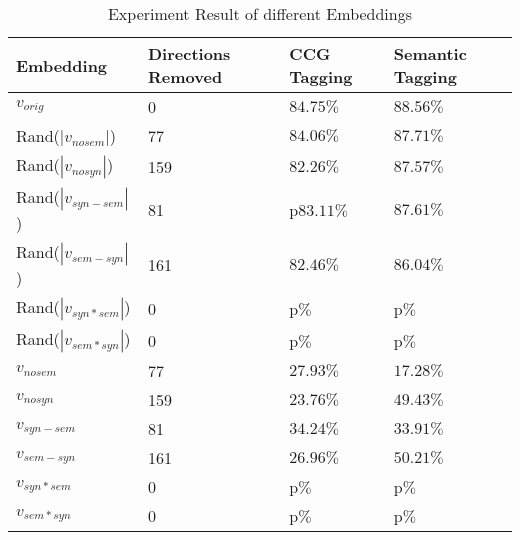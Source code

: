 \documentclass[11pt,a4paper]{article}
\begin{document}
\begin{table*}[h]
    \centering
    \begin{tabular}{llll}
    \hline
    \textbf{Embedding} & \textbf{Directions Removed} & \textbf{CCG Tagging} &\textbf{Semantic Tagging} \\
    \hline
    $v_{orig}$ & 0 & $84.75\%$ & $88.56\%$ \\
    \hline

    Rand($|v_{nosem}|$) & 77 & $84.06\%$ & $87.71\%$ \\
    Rand($|v_{nosyn}|$) & 159 & $82.26\%$ & $87.57\%$ \\
    Rand($|v_{syn-sem}|$) & 81 & p$83.11\%$ & $87.61\%$ \\
    Rand($|v_{sem-syn}|$) & 161 & $82.46\%$ & $86.04\%$ \\
    Rand($|v_{syn*sem}|$) & 0 & p$\%$ & p$\%$ \\
    Rand($|v_{sem*syn}|$) & 0 & p$\%$ & p$\%$ \\
    \hline
    $v_{nosem}$ & 77 & $27.93\%$ & $17.28\%$ \\
    $v_{nosyn}$ & 159 & $23.76\%$ & $49.43\%$ \\
    $v_{syn-sem}$ & 81 & $34.24\%$ & $33.91\%$ \\
    $v_{sem-syn}$ & 161 & $26.96\%$ & $50.21\%$ \\
    $v_{syn*sem}$ & 0 & p$\%$ & p$\%$ \\
    $v_{sem*syn}$ & 0 & p$\%$ & p$\%$ \\
    \hline
    \hline
    \end{tabular}
    \caption{\label{role description} Experiment Result of different Embeddings
    }
    \end{table*}

\end{document}
